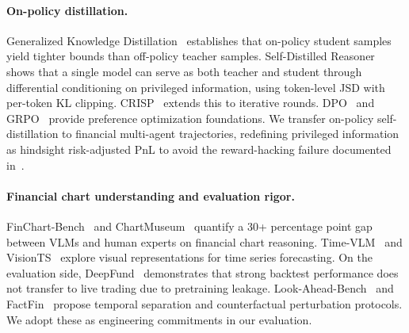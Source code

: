 \paragraph{On-policy distillation.}
Generalized Knowledge Distillation~\cite{gkd2024} establishes that on-policy student samples yield tighter bounds than off-policy teacher samples. Self-Distilled Reasoner~\cite{opsd2026} shows that a single model can serve as both teacher and student through differential conditioning on privileged information, using token-level JSD with per-token KL clipping. CRISP~\cite{crisp2026} extends this to iterative rounds. DPO~\cite{dpo2023} and GRPO~\cite{grpo2024} provide preference optimization foundations. We transfer on-policy self-distillation to financial multi-agent trajectories, redefining privileged information as hindsight risk-adjusted PnL to avoid the reward-hacking failure documented in~\cite{losingwinner2025}.

\paragraph{Financial chart understanding and evaluation rigor.}
FinChart-Bench~\cite{finchartbench2025} and ChartMuseum~\cite{chartmuseum2025} quantify a 30+ percentage point gap between VLMs and human experts on financial chart reasoning. Time-VLM~\cite{timevlm2025} and VisionTS~\cite{visionts2024} explore visual representations for time series forecasting. On the evaluation side, DeepFund~\cite{deepfund2025} demonstrates that strong backtest performance does not transfer to live trading due to pretraining leakage. Look-Ahead-Bench~\cite{lookaheadbench2026} and FactFin~\cite{factfin2025} propose temporal separation and counterfactual perturbation protocols. We adopt these as engineering commitments in our evaluation.
